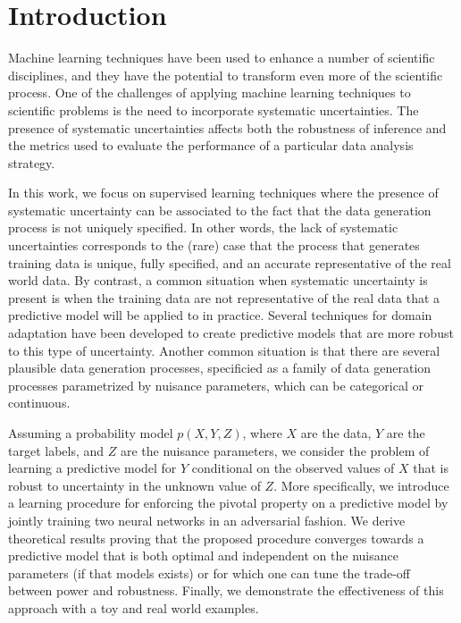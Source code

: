 \documentclass[twocolumn,superscriptaddress,aps]{revtex4-1}
\newcommand{\kcnote}[1]{\textcolor{red}{[KC: #1]}}
\theoremstyle{plain}
\begin{document}
\maketitle

\section{Introduction}



Machine learning techniques have been used to enhance a number of scientific
disciplines, and they have the potential to transform even more of the
scientific process. One of the challenges of applying machine learning
techniques to scientific problems is the need to incorporate systematic
uncertainties. The presence of systematic uncertainties affects both the
robustness of inference and the metrics used to evaluate the performance of a
particular data analysis strategy.

In this work, we focus on supervised learning techniques where the presence of
systematic uncertainty can be associated to the fact that the data generation
process is not uniquely specified. In other words, the lack of systematic
uncertainties corresponds to the (rare) case that the process that generates
training data is unique, fully specified, and an accurate representative of the
real world data.
By contrast, a common situation when systematic uncertainty is present is when the training
data are not representative of the real data that a predictive model will be
applied to in practice. Several techniques for domain adaptation have been
developed to create predictive models that are more robust to this type of
uncertainty.
Another common situation is that there are several plausible data generation
processes, specificied as a family of data generation processes
parametrized by nuisance parameters, which can be categorical or continuous.

Assuming a probability model $p(X,Y,Z)$, where $X$ are the data, $Y$ are the
target labels, and $Z$ are the nuisance parameters, we consider the problem of
learning a predictive model for $Y$ conditional on the observed values of $X$
that is robust to uncertainty in the unknown value of $Z$. More specifically, we
introduce a learning procedure for enforcing the pivotal property on a
predictive model by jointly training two neural networks in an adversarial
fashion. We derive theoretical results proving that the proposed procedure
converges towards a predictive model that is both optimal and independent on the
nuisance parameters (if that models exists) or for which one can tune the
trade-off between power and robustness. Finally, we demonstrate the
effectiveness of this approach with a toy and real world examples.
\end{document}
